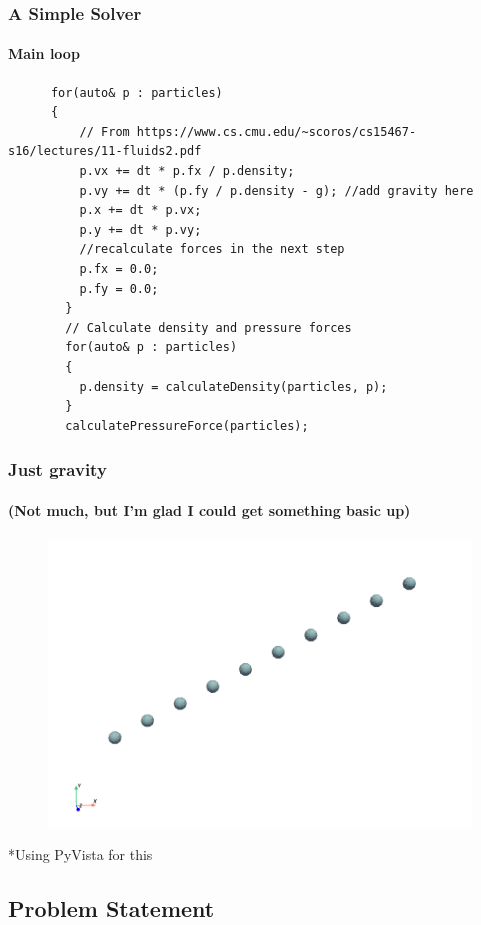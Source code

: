 \documentclass[notheorems, aspectratio=169]{beamer}
\begin{document}
      
    \begin{frame}[fragile]
    \frametitle{A Simple Solver}
    \framesubtitle{Main loop}
    
    \begin{lstlisting}
      for(auto& p : particles)
      {
          // From https://www.cs.cmu.edu/~scoros/cs15467-s16/lectures/11-fluids2.pdf
          p.vx += dt * p.fx / p.density;
          p.vy += dt * (p.fy / p.density - g); //add gravity here
          p.x += dt * p.vx;
          p.y += dt * p.vy;
          //recalculate forces in the next step
          p.fx = 0.0;
          p.fy = 0.0;
        }
        // Calculate density and pressure forces
        for(auto& p : particles)
        {
          p.density = calculateDensity(particles, p);
        }
        calculatePressureForce(particles);
        \end{lstlisting}
    
      \end{frame}

      \begin{frame}
        \frametitle{Just gravity}
        \framesubtitle{(Not much, but I'm glad I could get something basic up)}

        \begin{figure}
          \centering
          \includegraphics[width=0.5\linewidth]{pictures/solver_test.png} 
        \end{figure}
        
        *Using PyVista for this
      
      \end{frame}
      
  \subsection{Problem Statement}
\end{document}

